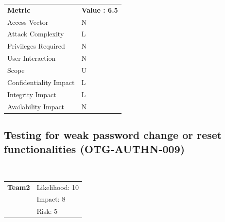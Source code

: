 \documentclass[headsepline,footsepline,footinclude=false,oneside,fontsize=11pt,paper=a4,listof=totoc,bibliography=totoc]{scrbook} %
\begin{document}
\begin{center}
	\begin{tabular}{ll}
		\rowcolor[HTML]{34CDF9}
		{\color[HTML]{ECF4FF} \textbf{Metric}}        & {\color[HTML]{ECF4FF} \textbf{Value : 6.5}} \\
		\rowcolor[HTML]{BBDAFF}
		{\color[HTML]{333333} Access Vector}          & {\color[HTML]{333333} } N              \\
		\rowcolor[HTML]{ECF4FF}
		{\color[HTML]{333333} Attack Complexity}      & {\color[HTML]{333333} } L              \\
		\rowcolor[HTML]{BBDAFF}
		{\color[HTML]{333333} Privileges Required}    & {\color[HTML]{333333} } N              \\
		\rowcolor[HTML]{ECF4FF}
		{\color[HTML]{333333} User Interaction}       & {\color[HTML]{333333} } N              \\
		\rowcolor[HTML]{BBDAFF}
		{\color[HTML]{333333} Scope}                  & {\color[HTML]{333333} } U              \\
		\rowcolor[HTML]{ECF4FF}
		{\color[HTML]{333333} Confidentiality Impact} & {\color[HTML]{333333} } L              \\
		\rowcolor[HTML]{BBDAFF}
		{\color[HTML]{333333} Integrity Impact}       & {\color[HTML]{333333} } L              \\
		\rowcolor[HTML]{ECF4FF}
		{\color[HTML]{333333} Availability Impact}    & {\color[HTML]{333333} } N
	\end{tabular}
\end{center}

\pagebreak
\subsection{Testing for weak password change or reset functionalities (OTG-AUTHN-009)}\
\begin{tabular}{cR{12cm}}
	\textbf{Team2} & Likelihood: 10\\& Impact: 8\\& Risk: 5
\end{tabular}
\end{document}
